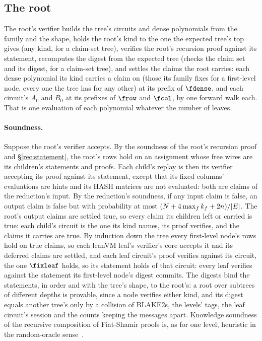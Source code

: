 \subsection{The root}\label{rec:root}

The root's verifier builds the tree's circuits and dense polynomials from the family and the shape, holds the root's kind to the one the expected tree's top gives (any kind, for a claim-set tree), verifies the root's recursion proof against its statement, recomputes the digest from the expected tree (checks the claim set and its digest, for a claim-set tree), and settles the claims the root carries: each dense polynomial its kind carries a claim on (those its family fixes for a first-level node, every one the tree has for any other) at its prefix of $\fdense$, and each circuit's $A_0$ and $B_0$ at its prefixes of $\frow$ and $\fcol$, by one forward walk each. That is one evaluation of each polynomial whatever the number of leaves.

\paragraph{Soundness.} Suppose the root's verifier accepts. By the soundness of the root's recursion proof and \S\ref{rec:statement}, the root's rows hold on an assignment whose free wires are its children's statements and proofs. Each child's replay is then its verifier accepting its proof against its statement, except that its fixed columns' evaluations are hints and its \textsf{HASH} matrices are not evaluated: both are claims of the reduction's input. By the reduction's soundness, if any input claim is false, an output claim is false but with probability at most $(N+4\max_fk_f+2n)/|E|$. The root's output claims are settled true, so every claim its children left or carried is true: each child's circuit is the one its kind names, its proof verifies, and the claims it carries are true. By induction down the tree every first-level node's rows hold on true claims, so each leanVM leaf's verifier's core accepts it and its deferred claims are settled, and each leaf circuit's proof verifies against its circuit, the one $\fixleaf$ holds, so its statement holds of that circuit: every leaf verifies against the statement its first-level node's digest commits. The digests bind the statements, in order and with the tree's shape, to the root's: a root over subtrees of different depths is provable, since a node verifies either kind, and its digest equals another tree's only by a collision of BLAKE2s, the levels' tags, the leaf circuit's session and the counts keeping the messages apart. Knowledge soundness of the recursive composition of Fiat-Shamir proofs is, as for one level, heuristic in the random-oracle sense~\cite{BCCT13}.

